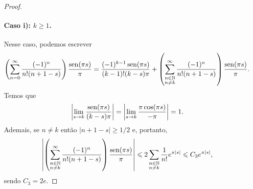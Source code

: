 \begin{proof}
        \paragraph{Caso i): $k\geq 1$.} Nesse caso, podemos escrever
        \begin{align*}
            \left(\sum_{n=0}^{\infty} \frac{(-1)^n}{n!(n+1-s)}\right)\frac{\operatorname{sen}(\pi s)}{\pi}
            = \frac{(-1)^{k-1}\operatorname{sen}(\pi s)}{(k-1)!(k-s)\pi} +
            \left(\sum_{\substack{n\in\mathbb{N} \\ n\neq k}}^{\infty} 
            \frac{(-1)^n}{n!(n+1-s)}\right)\frac{\operatorname{sen}(\pi s)}{\pi}.
        \end{align*}
        Temos que
        \[
        \left|\lim_{s\to k} \frac{\operatorname{sen}(\pi s)}{(k-s)\pi}\right| 
        = \left|\lim_{s\to k} \frac{\pi\cos(\pi s)}{-\pi}\right|
        = 1.
        \]
        Ademais, se $n\neq k$ então $|n+1-s| \geq 1/2$ e, portanto,
        \begin{align*}
            \left|\left(\sum_{\substack{n\in\mathbb{N} \\ n\neq k}}^{\infty} 
            \frac{(-1)^n}{n!(n+1-s)}\right)\frac{\operatorname{sen}(\pi s)}{\pi}\right|
            \leqslant 2\sum_{\substack{n\in\mathbb{N} \\ n\neq k}} \frac{1}{n!}e^{\pi |s|}
            \leqslant C_3e^{\pi |s|},
        \end{align*}
        sendo $C_3 = 2e$.

\end{proof}
